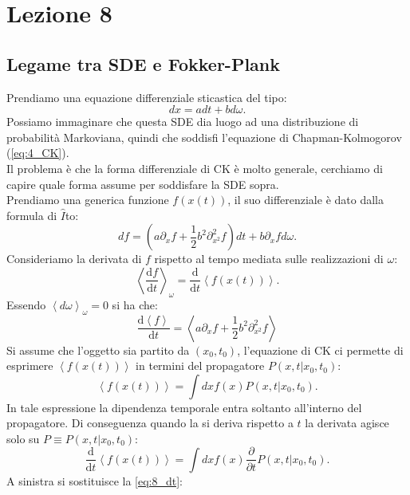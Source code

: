 \section{Lezione 8}%
\label{sub:Lezione 8}
\subsection{Legame tra SDE e Fokker-Plank}%
\label{sub:Legame tra SDE e Fokker-Plank}
Prendiamo una equazione differenziale sticastica del tipo:
\[
    dx = adt + bd\omega
.\] 
Possiamo immaginare che questa SDE dia luogo ad una distribuzione di probabilità Markoviana, quindi che soddisfi l'equazione di Chapman-Kolmogorov (\ref{eq:4_CK}). \\
Il problema è che la forma differenziale di CK è molto generale, cerchiamo di capire quale forma assume per soddisfare la SDE sopra.\\
Prendiamo una generica funzione $f(x(t))$, il suo differenziale è dato dalla formula di $\hat{I}$to:
\[
    df = \left(a\partial_{x}f + \frac{1}{2}b^2\partial^2_{x^2}f\right)dt + b \partial_{x}f d\omega
.\] 
Consideriamo la derivata di $f$ rispetto al tempo mediata sulle realizzazioni di $\omega$:
\[
    \left<\frac{\text{d} f}{\text{d} t} \right>_{\omega} = \frac{\text{d} }{\text{d} t} \left<f(x(t) )\right>
.\] 
Essendo $\left<d\omega\right>_{\omega}=0$ si ha che:
\begin{equation}
    \frac{\text{d} \left<f\right>}{\text{d} t} = \left<a \partial_{x}f +\frac{1}{2}b^2\partial^2_{x^2}f\right>
    \label{eq:8_dt}
\end{equation}
Si assume che l'oggetto sia partito da $\left(x_0, t_0\right)$, l'equazione di CK ci permette di esprimere $\left<f(x(t))\right>$ in termini del propagatore $P\left(x,t|x_0, t_0\right)$:
\[
    \left<f(x(t) ) \right> =  \int  dx f(x) P\left(x,t|x_0, t_0\right)
.\] 
In tale espressione la dipendenza temporale entra soltanto all'interno del propagatore. Di conseguenza quando la si deriva rispetto a $t$ la derivata agisce solo su $P \equiv P(x,t|x_0,t_0)$:
\[
   \frac{\text{d} }{\text{d} t} \left<f(x(t) ) \right> =  \int  dx f(x) \frac{\partial }{\partial t}  P\left(x,t|x_0, t_0\right)
.\] 
A sinistra si sostituisce la \ref{eq:8_dt}:

